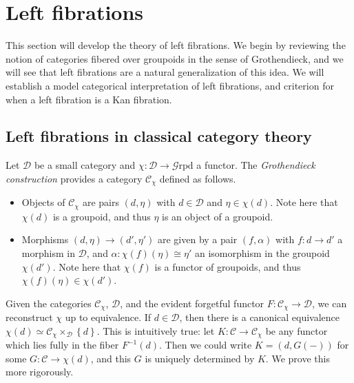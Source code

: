 \section{Left fibrations}

This section will develop the theory of left fibrations. We begin by reviewing the notion of categories fibered over groupoids in the sense of Grothendieck, and we will see that left fibrations are a natural generalization of this idea. We will establish a model categorical interpretation of left fibrations, and criterion for when a left fibration is a Kan fibration.

\subsection{Left fibrations in classical category theory}

Let $\mathcal{D} $ be a small category and $\chi : \mathcal{D}  \to \mathcal{G} \mathrm{rpd} $ a functor. The \emph{Grothendieck construction} provides a category $\mathcal{C}_\chi $ defined as follows.
\begin{itemize}
	\item Objects of $\mathcal{C} _\chi $ are pairs $(d,\eta )$ with $d\in \mathcal{D} $ and $\eta \in \chi (d)$. Note here that $\chi (d)$ is a groupoid, and thus $\eta $ is an object of a groupoid.
	\item Morphisms $(d,\eta )\to (d',\eta ')$ are given by a pair $(f,\alpha )$ with $f : d \to d'$ a morphism in $\mathcal{D} $, and $\alpha : \chi (f)(\eta ) \cong \eta '$ an isomorphism in the groupoid $\chi (d')$. Note here that $\chi (f)$ is a functor of groupoids, and thus $\chi (f)(\eta )\in \chi (d')$.
\end{itemize}

Given the categories $\mathcal{C} _\chi $, $\mathcal{D} $, and the evident forgetful functor $F : \mathcal{C} _\chi  \to \mathcal{D} $, we can reconstruct $\chi $ up to equivalence. If $d\in \mathcal{D} $, then there is a canonical equivalence $\chi (d) \simeq \mathcal{C} _\chi \times _\mathcal{D} \left\{ d \right\} $. This is intuitively true: let $K : \mathcal{C}  \to \mathcal{C} _\chi $ be any functor which lies fully in the fiber $F^{-1} (d)$. Then we could write $K=(d,G(-))$ for some $G : \mathcal{C}  \to \chi (d)$, and this $G$ is uniquely determined by $K$. We prove this more rigorously.

